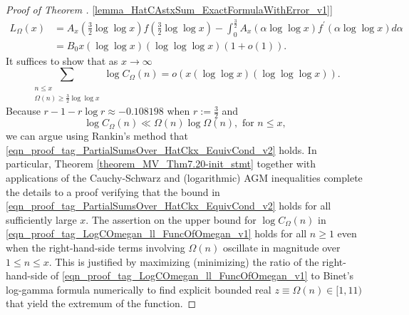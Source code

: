 \documentclass[11pt,reqno,a4letter]{article}
\newcommand{\hlocalref}[1]{\hyperref[#1]{\ref{#1}}}
\numberwithin{equation}{section}
\numberwithin{figure}{section}
\numberwithin{table}{section}
\theoremstyle{plain}
\numberwithin{theorem}{section}
\theoremstyle{definition}
\begin{document}
\begin{proof}[Proof of Theorem \hlocalref{lemma_HatCAstxSum_ExactFormulaWithError_v1}]
\begin{align*}
L_{\Omega}(x) & = A_x\left(\frac{3}{2}\log\log x\right) f\left(\frac{3}{2}\log\log x\right) - 
	\int_0^{\frac{3}{2}} A_x(\alpha \log\log x) f^{\prime}(\alpha \log\log x) d\alpha \\ 
	& = 
	B_0 x (\log\log x)(\log\log\log x) \left(1 + o(1)\right). 
\end{align*}
It suffices to show that as $x \rightarrow \infty$ 
\begin{equation}
\label{eqn_proof_tag_PartialSumsOver_HatCkx_EquivCond_v2}
\sum_{\substack{n \leq x \\ \Omega(n) \geq \frac{3}{2} \log\log x}} 
	\log C_{\Omega}(n)= o\left(x (\log\log x) (\log\log\log x)\right). 
\end{equation}
Because $r-1-r\log r \approx -0.108198$ when $r := \frac{3}{2}$ and 
\begin{equation}
\label{eqn_proof_tag_LogCOmegan_ll_FuncOfOmegan_v1}
\log C_{\Omega}(n) \ll \Omega(n) \log \Omega(n), \text{ for } n \leq x,
\end{equation}
we can argue using Rankin's method \cite[Thm.~7.20; \S 7.4]{MV} that 
\eqref{eqn_proof_tag_PartialSumsOver_HatCkx_EquivCond_v2} holds. 
In particular, 
Theorem \hlocalref{theorem_MV_Thm7.20-init_stmt} 
together with applications of the Cauchy-Schwarz and 
(logarithmic) AGM inequalities 
complete the details to a proof verifying that the bound in 
\eqref{eqn_proof_tag_PartialSumsOver_HatCkx_EquivCond_v2} 
holds for all sufficiently large $x$. 
The assertion on the upper bound for $\log C_{\Omega}(n)$ in 
\eqref{eqn_proof_tag_LogCOmegan_ll_FuncOfOmegan_v1} holds 
for all $n \geq 1$ even when the right-hand-side terms involving $\Omega(n)$ 
oscillate in magnitude over $1 \leq n \leq x$. This is justified by 
maximizing (minimizing) the ratio of the right-hand-side of 
\eqref{eqn_proof_tag_LogCOmegan_ll_FuncOfOmegan_v1} to 
Binet's log-gamma formula numerically to find explicit bounded real 
$z \equiv \Omega(n) \in [1, 11)$ 
that yield the extremum of the function.
\end{proof} 
\end{document}
